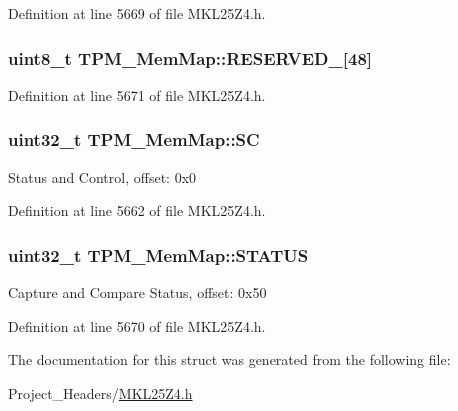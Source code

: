 Definition at line 5669 of file M\+K\+L25\+Z4.\+h.

\subsubsection[{\texorpdfstring{R\+E\+S\+E\+R\+V\+E\+D\+\_\+1}{RESERVED_1}}]{\setlength{\rightskip}{0pt plus 5cm}uint8\+\_\+t T\+P\+M\+\_\+\+Mem\+Map\+::\+R\+E\+S\+E\+R\+V\+E\+D\+\_\mbox{[}48\mbox{]}}\hypertarget{struct_t_p_m___mem_map_a499e989c62e9a964e2fdb7ef685ea038}{}\label{struct_t_p_m___mem_map_a499e989c62e9a964e2fdb7ef685ea038}


Definition at line 5671 of file M\+K\+L25\+Z4.\+h.

\subsubsection[{\texorpdfstring{SC}{SC}}]{\setlength{\rightskip}{0pt plus 5cm}uint32\+\_\+t T\+P\+M\+\_\+\+Mem\+Map\+::\+SC}\hypertarget{struct_t_p_m___mem_map_af4ec20dde961637160e35e7ab113d9da}{}\label{struct_t_p_m___mem_map_af4ec20dde961637160e35e7ab113d9da}
Status and Control, offset\+: 0x0 

Definition at line 5662 of file M\+K\+L25\+Z4.\+h.

\subsubsection[{\texorpdfstring{S\+T\+A\+T\+US}{STATUS}}]{\setlength{\rightskip}{0pt plus 5cm}uint32\+\_\+t T\+P\+M\+\_\+\+Mem\+Map\+::\+S\+T\+A\+T\+US}\hypertarget{struct_t_p_m___mem_map_abf85830377235aa5b5d58cc0f86d06b7}{}\label{struct_t_p_m___mem_map_abf85830377235aa5b5d58cc0f86d06b7}
Capture and Compare Status, offset\+: 0x50 

Definition at line 5670 of file M\+K\+L25\+Z4.\+h.



The documentation for this struct was generated from the following file\+:\begin{DoxyCompactItemize}
\item 
Project\+\_\+\+Headers/\hyperlink{_m_k_l25_z4_8h}{M\+K\+L25\+Z4.\+h}\end{DoxyCompactItemize}
